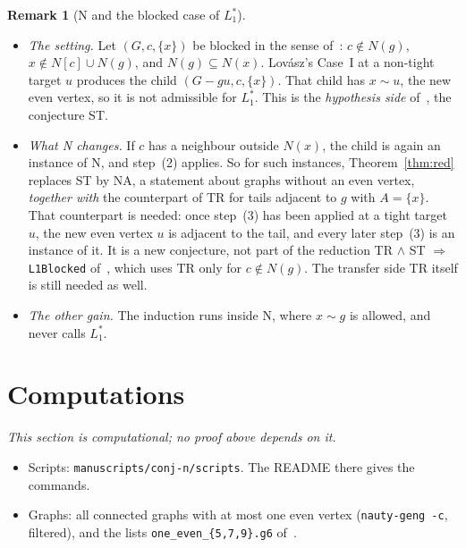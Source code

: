 \documentclass[11pt]{amsart}
\theoremstyle{definition}
\newtheorem{remark}[theorem]{Remark}
\begin{document}
\begin{remark}[N and the blocked case of $L_1^*$]\label{rem:blocked}
\begin{itemize}
\item \emph{The setting.} Let $(G,c,\{x\})$ be blocked in the sense of~\cite{L1S,L1I}: $c\notin
N(g)$, $x\notin N[c]\cup N(g)$, and $N(g)\subseteq N(x)$. Lov\'asz's Case~I at a non-tight target
$u$ produces the child $(G-gu,c,\{x\})$. That child has $x\sim u$, the new even vertex, so it is
not admissible for $L_1^*$. This is the \emph{hypothesis side} of~\cite{L1I}, the conjecture ST.
\item \emph{What N changes.} If $c$ has a neighbour outside $N(x)$, the child is again an instance
of N, and step~(2) applies. So for such instances, Theorem~\ref{thm:red} replaces ST by NA, a
statement about graphs without an even vertex, \emph{together with} the counterpart of TR for
tails adjacent to $g$ with $A=\{x\}$. That counterpart is needed: once step~(3) has been applied
at a tight target $u$, the new even vertex $u$ is adjacent to the tail, and every later step~(3)
is an instance of it. It is a new conjecture, not part of the reduction TR $\wedge$ ST $\Rightarrow$
\texttt{L1Blocked} of~\cite{L1I}, which uses TR only for $c\notin N(g)$. The transfer side TR
itself is still needed as well.
\item \emph{The other gain.} The induction runs inside N, where $x\sim g$ is allowed, and never
calls $L_1^*$.
\end{itemize}
\end{remark}

\section{Computations}\label{sec:comp}

\emph{This section is computational; no proof above depends on it.}
\begin{itemize}
\item Scripts: \texttt{manuscripts/conj-n/scripts}. The README there gives the commands.
\item Graphs: all connected graphs with at most one even vertex (\texttt{nauty-geng -c}, filtered),
and the lists \texttt{one\_even\_\{5,7,9\}.g6} of~\cite{STL}.
\end{itemize}
\end{document}
